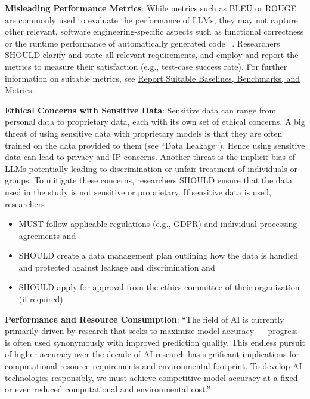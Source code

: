 \begin{itemize}
\textbf{Misleading Performance Metrics}:
While metrics such as BLEU or ROUGE are commonly used to evaluate the performance of LLMs, they may not capture other relevant, software engineering-specific aspects such as functional correctness or the runtime performance of automatically generated code ~\cite{DBLP:conf/nips/LiuXW023}.
Researchers SHOULD clarify and state all relevant requirements, and employ and report the metrics to measure their satisfaction (e.g., test-case success rate). For further information on suitable metrics, see \href{/guidelines/report-baselines-benchmarks-and-metrics}{Report Suitable Baselines, Benchmarks, and Metrics}.

\textbf{Ethical Concerns with Sensitive Data}:
Sensitive data can range from personal data to proprietary data, each with its own set of ethical concerns. A big threat of using sensitive data with proprietary models is that they are often trained on the data provided to them (see ``Data Leakage``). Hence using sensitive data can lead to privacy and IP concerns.
Another threat is the implicit bias of LLMs potentially leading to discrimination or unfair treatment of individuals or groups.
To mitigate these concerns, researchers SHOULD ensure that the data used in the study is not sensitive or proprietary. 
If sensitive data is used, researchers 
\begin{itemize}
  \item MUST follow applicable regulations (e.g., GDPR) and individual processing agreements and
  \item SHOULD create a data management plan outlining how the data is handled and protected against leakage and discrimination and
  \item SHOULD apply for approval from the ethics committee of their organization (if required)
\end{itemize}

\textbf{Performance and Resource Consumption}:
\enquote{The field of AI is currently primarily driven by research that seeks to maximize model accuracy — progress is often used synonymously with improved prediction quality. This endless pursuit of higher accuracy over the decade of AI research has significant implications for computational resource requirements and environmental footprint. To develop AI technologies responsibly, we must achieve competitive model accuracy at a fixed or even reduced computational and environmental cost.} ~\cite{DBLP:conf/mlsys/WuRGAAMCBHBGGOM22}


\end{itemize}
